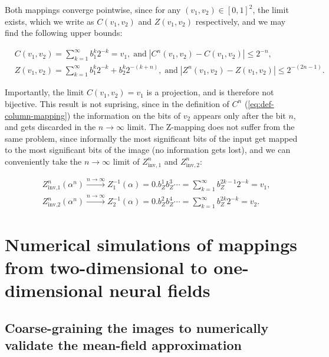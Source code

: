 \documentclass[10pt,letterpaper]{article}
\begin{document}
Both mappings converge pointwise, since for any $(v_1,v_2) \in [0,1]^2$, the limit exists, which we write as $C(v_1,v_2)$ and $Z(v_1,v_2)$ respectively, and we may find the following upper bounds:

\begin{equation} \begin{aligned}
& C(v_1,v_2) = \sum_{k=1}^\infty b_1^k 2^{-k} = v_1, \;\text{and}\; |C^n(v_1,v_2)-C(v_1,v_2)| \leq 2^{-n},\\
& Z(v_1,v_2) = \sum_{k=1}^\infty b_1^k 2^{-k} + b_2^k 2^{-(k+n)}, \;\text{and}\; |Z^n(v_1,v_2)-Z(v_1,v_2)|\leq 2^{-(2n-1)}.
\end{aligned} \end{equation}

Importantly, the limit $C(v_1,v_2)=v_1$ is a projection, and is therefore not bijective. This result is not suprising, since in the definition of $C^n$ (\autoref{eq:def-column-mapping}) the information on the bits of $v_2$ appears only after the bit $n$, and gets discarded in the $n \to \infty$ limit. The Z-mapping does not suffer from the same problem, since informally the most significant bits of the input get mapped to the most significant bits of the image (no information gets lost), and we can conveniently take the $n \to \infty$ limit of $Z_{\textrm{inv},1}^n$ and $Z_{\textrm{inv},2}^n$:

\begin{equation} \begin{aligned}
&Z_{\textrm{inv,1}}^n(\alpha^n) \xrightarrow{n \to \infty} Z^{-1}_1(\alpha) = 0.b_Z^1 b_Z^3 \cdots = \sum_{k=1}^\infty b_Z^{2k-1} 2^{-k} = v_1,\\
&Z_{\textrm{inv,2}}^n(\alpha^n) \xrightarrow{n \to \infty} Z^{-1}_2(\alpha) = 0.b_Z^2 b_Z^4 \cdots = \sum_{k=1}^\infty b_Z^{2k} 2^{-k} = v_2.
\end{aligned} \end{equation}

\section{Numerical simulations of mappings from two-dimensional to one-dimensional neural fields}

\subsection{Coarse-graining the images to numerically validate the mean-field approximation}
\end{document}
